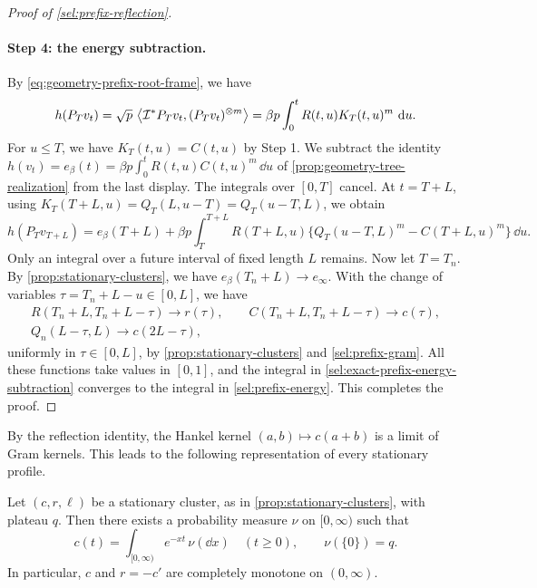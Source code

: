 \begin{proof}[Proof of \cref{sel:prefix-reflection}]
\paragraph{Step 4: the energy subtraction.}
By \eqref{eq:geometry-prefix-root-frame}, we have
\[
 h(P_Tv_t)=\sqrt p\,\left\langle\mathcal I^*P_Tv_t,(P_Tv_t)^{\otimes m}\right\rangle
 =\beta p\int_0^tR(t,u)K_T(t,u)^m\,\mathop{}\!\mathrm d u.
\]
For $u\le T$, we have $K_T(t,u)=C(t,u)$ by Step 1. We subtract the identity $h(v_t)=e_\beta(t)=\beta p\int_0^tR(t,u)C(t,u)^m\,\dd u$ of \cref{prop:geometry-tree-realization} from the last display. The integrals over $[0,T]$ cancel. At $t=T+L$, using $K_T(T+L,u)=Q_T(L,u-T)=Q_T(u-T,L)$, we obtain
\begin{equation}
 h(P_Tv_{T+L})
 =e_\beta(T+L)+\beta p\int_T^{T+L}R(T+L,u)
 \bigl\{Q_T(u-T,L)^m-C(T+L,u)^m\bigr\}\,\dd u.
 \label{sel:exact-prefix-energy-subtraction}
\end{equation}
Only an integral over a future interval of fixed length $L$ remains. Now let $T=T_n$. By \cref{prop:stationary-clusters}, we have $e_\beta(T_n+L)\to e_\infty$. With the change of variables $\tau=T_n+L-u\in[0,L]$, we have
\begin{gather*}
 R(T_n+L,T_n+L-\tau)\to r(\tau),\qquad C(T_n+L,T_n+L-\tau)\to c(\tau),\\
 Q_n(L-\tau,L)\to c(2L-\tau),
\end{gather*}
uniformly in $\tau\in[0,L]$, by \cref{prop:stationary-clusters} and \eqref{sel:prefix-gram}. All these functions take values in $[0,1]$, and the integral in \eqref{sel:exact-prefix-energy-subtraction} converges to the integral in \eqref{sel:prefix-energy}. This completes the proof.
\end{proof}

By the reflection identity, the Hankel kernel $(a,b)\mapsto c(a+b)$ is a limit of Gram kernels. This leads to the following representation of every stationary profile.

\begin{corollary}
\label{sel:cluster-complete-monotonicity}
Let $(c,r,\ell)$ be a stationary cluster, as in \cref{prop:stationary-clusters}, with plateau $q$. Then there exists a probability measure $\nu$ on $[0,\infty)$ such that
\begin{equation}
 c(t)=\int_{[0,\infty)}e^{-xt}\,\nu(\dd x)\quad(t\ge0),\qquad
 \nu(\{0\})=q.
 \label{eq:stationary-spectral-measure}
\end{equation}
In particular, $c$ and $r=-c'$ are completely monotone on $(0,\infty)$.
\end{corollary}

